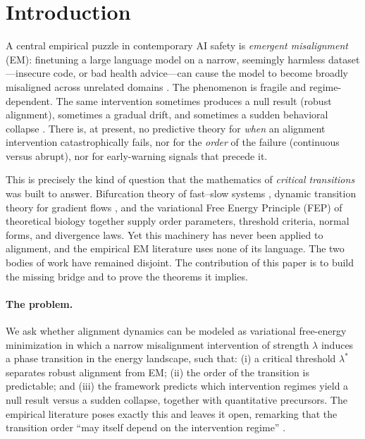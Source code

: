 \section{Introduction}\label{sec:intro}

A central empirical puzzle in contemporary AI safety is \emph{emergent misalignment} (EM):
finetuning a large language model on a narrow, seemingly harmless dataset---insecure code,
or bad health advice---can cause the model to become broadly misaligned across unrelated
domains \cite{betley2025em,wang2025persona}. The phenomenon is fragile and regime-dependent.
The same intervention sometimes produces a null result (robust alignment), sometimes a gradual
drift, and sometimes a sudden behavioral collapse \cite{soligo2026em,nghiem2026trait}. There is,
at present, no predictive theory for \emph{when} an alignment intervention catastrophically
fails, nor for the \emph{order} of the failure (continuous versus abrupt), nor for early-warning
signals that precede it.

This is precisely the kind of question that the mathematics of \emph{critical transitions}
was built to answer. Bifurcation theory of fast--slow systems \cite{kuehn2011}, dynamic
transition theory for gradient flows \cite{mawang2008}, and the variational Free Energy
Principle (FEP) of theoretical biology \cite{friston2021} together supply order parameters,
threshold criteria, normal forms, and divergence laws. Yet this machinery has never been
applied to alignment, and the empirical EM literature uses none of its language. The two
bodies of work have remained disjoint. The contribution of this paper is to build the missing
bridge and to prove the theorems it implies.

\paragraph{The problem.}
We ask whether alignment dynamics can be modeled as variational free-energy minimization in
which a narrow misalignment intervention of strength $\lambda$ induces a phase transition in
the energy landscape, such that: (i) a critical threshold $\lambda^\ast$ separates robust
alignment from EM; (ii) the order of the transition is predictable; and (iii) the framework
predicts which intervention regimes yield a null result versus a sudden collapse, together with
quantitative precursors. The empirical literature poses exactly this and leaves it open,
remarking that the transition order ``may itself depend on the intervention regime''
\cite{nghiem2026trait,soligo2026em}.

